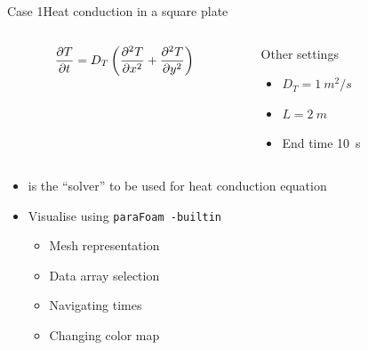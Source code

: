 \begin{frame}{Case 1}{Heat conduction in a square plate}
    \begin{columns}
        \begin{column}{0.5\linewidth}
            \begin{equation*}
                \pder{T}{t} = D_T \left( \pder[2]{T}{x} + \pder[2]{T}{y} \right)
            \end{equation*}
            \begin{figure}
            \end{figure}
        \end{column}
        \begin{column}{0.5\linewidth}
            Other settings
            \begin{itemize}
                \item $D_T=\qty{1}{m^2/s}$
                \item $L=\qty{2}{m}$
                \item End time \qty{10}{s}
            \end{itemize}
        \end{column}
    \end{columns}
    \begin{itemize}
        \item \lapfoam{} is the ``solver'' to be used for heat conduction equation
        \item Visualise using \texttt{paraFoam -builtin}
        \begin{itemize}
            \item Mesh representation
            \item Data array selection
            \item Navigating times
            \item Changing color map
        \end{itemize}
    \end{itemize}
\end{frame}

